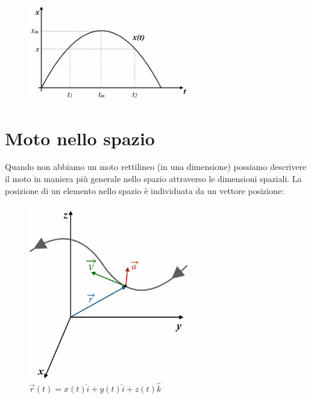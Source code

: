 \documentclass[a4paper,12pt]{report}
\begin{document}
\begin{itemize}
		\begin{figure}[H]
			\centering
			\includegraphics[width=200pt]{./immagini/cinematica/figcine5.png}
		\end{figure}
	\end{itemize}
	
	\section{Moto nello spazio}
	Quando non abbiamo un moto rettilineo (in una dimensione) possiamo descrivere il moto in maniera più generale nello spazio attraverso le dimensioni spaziali. La posizione di un elemento nello spazio è individuata da un vettore posizione:
	\begin{figure}[H]
		\centering
		\includegraphics[width=200pt]{./immagini/cinematica/figcine6.png}
		\caption{$\vec{r}(t) = x(t)\hat{i} + y(t)\hat{i} + z(t)\hat{k}$}
	\end{figure}
\end{document}
